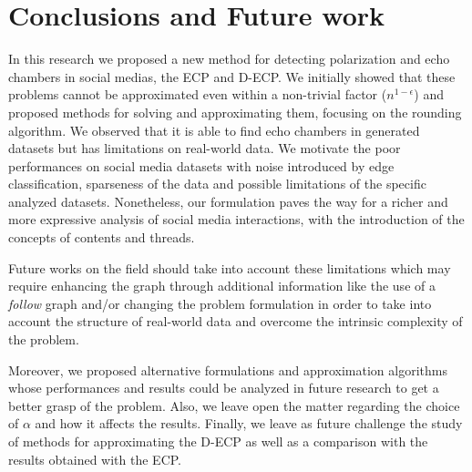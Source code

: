 \chapter{Conclusions and Future work}
\label{ch:conclusionsAndFutureWork}

In this research we proposed a new method for detecting polarization and echo
chambers in social medias, the \acrshort{ECP} and \acrshort{D-ECP}. We
initially showed that these problems cannot be approximated even within a
non-trivial factor ($n^{1-\epsilon}$) and proposed methods for solving and
approximating them, focusing on the rounding algorithm. We observed that it is
able to find echo chambers in generated datasets but has limitations on
real-world data. We motivate the poor performances on social media datasets
with noise introduced by edge classification, sparseness of the data and
possible limitations of the specific analyzed datasets. Nonetheless, our formulation paves the way for a richer and more
expressive analysis of social media interactions, with the introduction
of the concepts of contents and threads.

Future works on the field should take into account these limitations which
may require enhancing the graph through additional information like the use
of a \emph{follow} graph and/or
changing the problem formulation in order to take into account the structure
of real-world data and overcome the intrinsic complexity of the problem.

Moreover, we proposed alternative formulations and approximation algorithms
whose performances and results could be analyzed in future research to get a
better grasp of the problem. Also, we leave open the matter regarding the
choice of $\alpha$ and how it affects the results. Finally, we leave as future
challenge the study of methods for approximating the \acrshort{D-ECP} as well
as a comparison with the results obtained with the \acrshort{ECP}.
